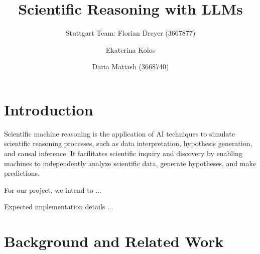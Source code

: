 \documentclass[10pt]{article}
\begin{document}
\title{Scientific Reasoning with LLMs}

\author{Stuttgart Team: Florian Dreyer (3667877) \and Ekaterina Kolos \and Daria Matiash (3668740)}

\maketitle             


\section{Introduction}

Scientific machine reasoning is the application of AI techniques to simulate scientific reasoning processes, such as  data interpretation, hypothesis generation, and causal inference. It facilitates scientific inquiry and discovery by enabling machines to independently analyze scientific data, generate hypotheses, and make predictions.

For our project, we intend to ...

Expected implementation details ...

\section{Background and Related Work}
\end{document}
